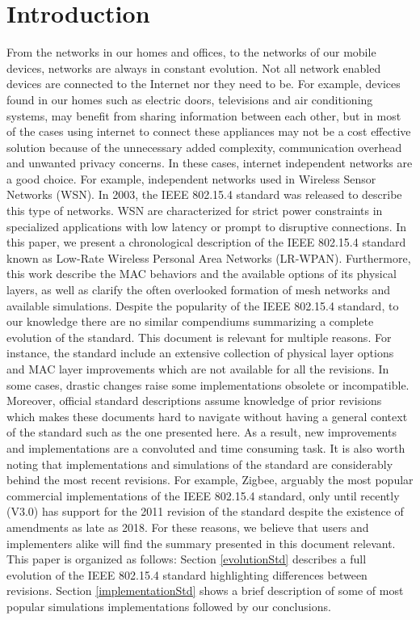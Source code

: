 \documentclass[conference]{IEEEtran}
\begin{document}
\section{Introduction}
From the networks in our homes and offices, to the networks of our mobile devices, networks are always in constant evolution. Not all network enabled devices are connected to the Internet nor they need to be. For example, devices found in our homes such as electric doors, televisions and air conditioning systems, may benefit from sharing information between each other, but in most of the cases using internet to connect these appliances may not be a cost effective solution because of the unnecessary added complexity, communication overhead and unwanted privacy concerns. In these cases, internet independent networks are a good choice. For example, independent networks used in Wireless Sensor Networks (WSN). In 2003, the IEEE 802.15.4 standard was released \cite{std2003} to describe this type of networks. WSN are characterized for strict power constraints in specialized applications with low latency or prompt to disruptive connections. In this paper, we present a chronological description of the IEEE 802.15.4 standard known as Low-Rate Wireless Personal Area Networks (LR-WPAN). Furthermore, this work describe the MAC behaviors and the available options of its physical layers, as well as clarify the often overlooked formation of mesh networks and available simulations. Despite the popularity of the IEEE 802.15.4 standard, to our knowledge there are no similar compendiums summarizing a complete evolution of the standard. This document is relevant for multiple reasons. For instance, the standard include an extensive collection of physical layer options and MAC layer improvements which are not available for all the revisions. In some cases, drastic changes raise some implementations obsolete or incompatible. Moreover, official standard descriptions assume knowledge of prior revisions which makes these documents hard to navigate without having a general context of the standard such as the one presented here. As a result, new improvements and implementations are a convoluted and time consuming task. It is also worth noting that implementations and simulations of the standard are considerably behind the most recent revisions. For example, Zigbee, arguably the most popular commercial implementations of the IEEE 802.15.4 standard, only until recently (V3.0) has support for the 2011 revision of the standard \cite{nxpManual} despite the existence of amendments as late as 2018. For these reasons, we believe that users and implementers alike will find the summary presented in this document relevant. This paper is organized as follows: Section \ref{evolutionStd} describes a full evolution of the IEEE 802.15.4 standard highlighting differences between revisions. %
Section \ref{implementationStd} shows a brief description of some of most popular simulations implementations followed by our conclusions.
\end{document}
